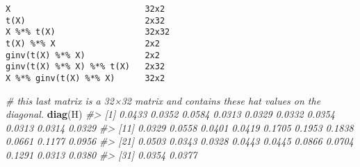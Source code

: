 \documentclass[]{book}
\newenvironment{Shaded}{\begin{snugshade}}{\end{snugshade}}
\newcommand{\CommentTok}[1]{\textcolor[rgb]{0.56,0.35,0.01}{\textit{#1}}}
\newcommand{\KeywordTok}[1]{\textcolor[rgb]{0.13,0.29,0.53}{\textbf{#1}}}
\newcommand{\NormalTok}[1]{#1}
\newcommand{\OperatorTok}[1]{\textcolor[rgb]{0.81,0.36,0.00}{\textbf{#1}}}
\newcommand{\StringTok}[1]{\textcolor[rgb]{0.31,0.60,0.02}{#1}}
\begin{document}
\begin{verbatim}
X                           32x2
t(X)                        2x32
X %*% t(X)                  32x32
t(X) %*% X                  2x2
ginv(t(X) %*% X)            2x2
ginv(t(X) %*% X) %*% t(X)   2x32
X %*% ginv(t(X) %*% X)      32x2
\end{verbatim}

\begin{Shaded}
\end{Shaded}

\begin{Shaded}
\end{Shaded}

\begin{Shaded}
\end{Shaded}

\begin{Shaded}
\begin{Highlighting}[]
\CommentTok{# this last matrix is a 32×32 matrix and contains these hat values on the diagonal.}
\KeywordTok{diag}\NormalTok{(H)}
\CommentTok{#>  [1] 0.0433 0.0352 0.0584 0.0313 0.0329 0.0332 0.0354 0.0313 0.0314 0.0329}
\CommentTok{#> [11] 0.0329 0.0558 0.0401 0.0419 0.1705 0.1953 0.1838 0.0661 0.1177 0.0956}
\CommentTok{#> [21] 0.0503 0.0343 0.0328 0.0443 0.0445 0.0866 0.0704 0.1291 0.0313 0.0380}
\CommentTok{#> [31] 0.0354 0.0377}
\end{Highlighting}
\end{Shaded}
\end{document}
